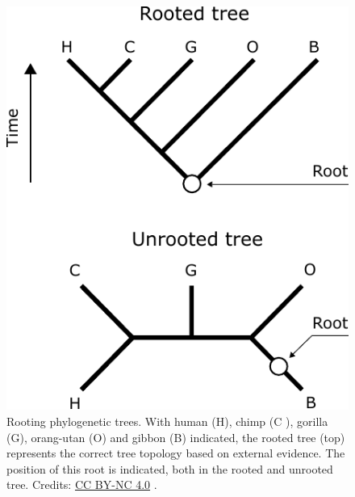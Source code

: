 % 

\begin{figure}[!htbp]
\centering
\includegraphics[width=0.6\linewidth]{files/hcgob_alt-7555d0de06b4ba6da03e1dc74f2cc0e8.pdf}
\caption[]{Rooting phylogenetic trees.
With human (H), chimp (C ), gorilla (G), orang-utan (O) and gibbon (B) indicated, the rooted tree (top) represents the correct tree topology based on external evidence.
The position of this root is indicated, both in the rooted and unrooted tree.
Credits: \href{https://creativecommons.org/licenses/by-nc/4.0/}{CC BY-NC 4.0} \cite{own_3_2024}.}
\label{hcgob_alt}
\end{figure}

% 

